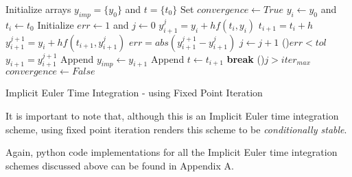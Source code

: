 \begin{center}
\smallskip
\begin{minipage}{.7\linewidth}
    \begin{algorithm}[H]
      \SetAlgoLined
      Initialize arrays $y_{imp}=\{y_0\}$ and $t=\{t_0\}$\;
      Set $convergence \gets True$\; 
      $y_{i} \gets y_0$ and $t_{i} \gets t_0$\;
        {
      	 {
		  Initialize $err \gets 1$ and $j \gets 0$\;		  	
		  $y^{j}_{i+1} = y_{i} + h f(t_{i}, y_{i})$\;		  	
		  $t_{i+1} = t_{i} + h$\;
		   {
			$y^{j+1}_{i+1} = y_{i} + h f(t_{i+1}, y^{j}_{i+1})$\;
			$err = abs(y^{j+1}_{i+1} - y^{j}_{i+1})$\;
			$j \gets j+1$\;
			\If(){$err < tol$}{ 
			  $y_{i+1} = y^{j+1}_{i+1}$\;
    	 	  Append $y_{imp} \gets y_{i+1}$\;
      		  Append $t \gets t_{i+1}$\;
      		  \textbf{break}\;
      		}
      		\If(){$j > iter_{max}$}{ 
			  $convergence \gets False$
      		}
      	  }
      	}
      }
     \caption{Implicit Euler Time Integration - using Fixed Point Iteration}
	\label{algo:imp_euler_analytical}
    \end{algorithm}
  \end{minipage}
\end{center}
It is important to note that, although this is an Implicit Euler time integration scheme, using fixed point iteration renders this scheme to be \textit{conditionally stable}.

Again, python code implementations for all the Implicit Euler time integration schemes discussed above can be found in Appendix A. 


